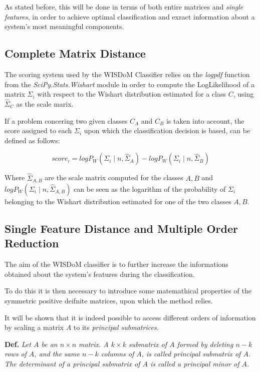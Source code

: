 \documentclass[12pt,openright,twoside,a4paper]{book}
\begin{document}
As stated before, this will be done in terms of both entire matrices and \textit{single features}, in order to achieve optimal classification and exract information about a system's most meaningful components.

\subsection{Complete Matrix Distance}

The scoring system used by the WISDoM Classifier relies on the \textit{logpdf} function from the \textit{SciPy.Stats.Wishart} module in order to compute the LogLikelihood of a matrix $\Sigma_i$ with respect to the Wishart distribution estimated for a class $C$, using $\hat{\Sigma}_C$ as the scale marix.

If a problem concering two given classes $C_A$ and $C_B$ is taken into account, the score assigned to each $\Sigma_i$ upon which the classification decision is based, can be defined as follows:

\begin{equation}
score_{i}= logP_{W}(\Sigma_{i}\mid n, \hat{\Sigma}_{A})-logP_{W}(\Sigma_{i}\mid n,\hat{\Sigma}_{B})
\label{pdf-score}
\end{equation}

Where $\hat{\Sigma}_{A,B}$ are the scale matrix computed for the classes $A,B$ and $ logP_{W}(\Sigma_{i}\mid n, \hat{\Sigma}_{A,B})$ can be seen as the logarithm of the probability of $\Sigma_i$ belonging to the Wishart distribution estimated for one of the two classes $A,B$.

\subsection{Single Feature Distance and Multiple Order Reduction}

The aim of the WISDoM classifier is to further increase the informations obtained about the system's features during the classification.

To do this it is then necessary to introduce some matemathical properties of the symmetric positive deifnite matrices, upon which the method relies.

It will be shown that it is indeed possible to access different orders of information by scaling a matrix $A$ to its \textit{principal submatrices}.

\vspace{5mm}

\textbf{Def.} \textit{Let $A$ be an $n \times n$ matrix. A $k \times k$ submatrix of $A$ formed by deleting $n-k$ rows of $A$, and the same $n-k$ columns of $A$, is called principal submatrix of $A$. The determinant of a principal submatrix of $A$ is called a principal minor of $A$.}
\end{document}
